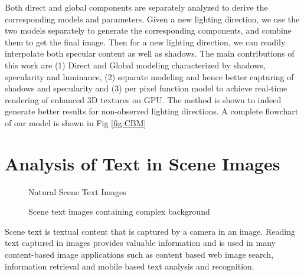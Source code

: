 Both direct and global components are separately analyzed to derive the
corresponding models and parameters. Given a new lighting direction, we use the
two models separately to generate the corresponding components, and combine them
to get the final image. Then for a new lighting direction, we can readily
interpolate both specular content as well as shadows.
The main contributions of this work are (1) Direct and Global modeling characterized by
shadows, specularity and luminance, 
(2) separate modeling and hence better capturing of shadows and specularity
and (3) per pixel function model to
achieve real-time rendering of enhanced 3D textures on GPU.
The method is shown to indeed
generate better results for non-observed lighting directions.
A complete flowchart of our model is shown in Fig \ref{fig:CBM}


\section{Analysis of Text in Scene Images}
\begin{figure}[t]
\centering
{}
\caption
{Natural Scene Text Images}
\label{fig:scenetext}
\end{figure}
\begin{figure}[t]
\centering
{}
\caption
{Scene text images containing complex background}
\label{fig:textchallenge}
\end{figure}

Scene text is textual content that is captured by a camera in an image.
Reading text captured in images provides valuable information and is
used in many content-based image
applications such as content based web image search,
information retrieval and mobile based text analysis
and recognition.

